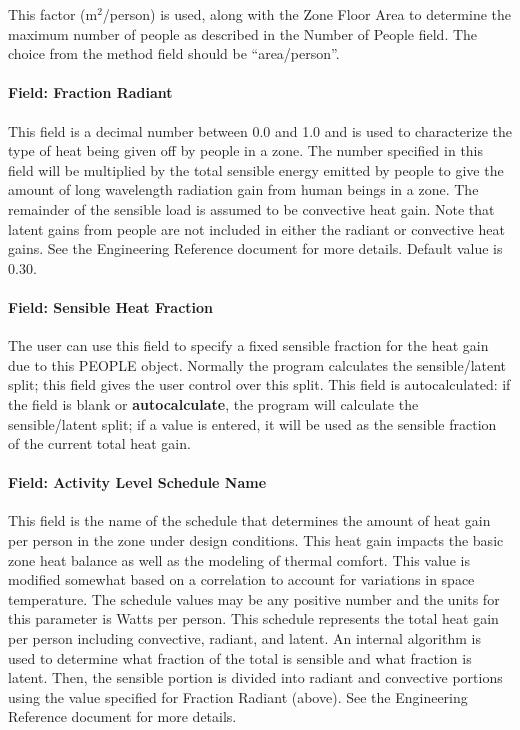 This factor (m\(^{2}\)/person) is used, along with the Zone Floor Area to determine the maximum number of people as described in the Number of People field. The choice from the method field should be ``area/person''.

\paragraph{Field: Fraction Radiant}\label{field-fraction-radiant}

This field is a decimal number between 0.0 and 1.0 and is used to characterize the type of heat being given off by people in a zone. The number specified in this field will be multiplied by the total sensible energy emitted by people to give the amount of long wavelength radiation gain from human beings in a zone. The remainder of the sensible load is assumed to be convective heat gain. Note that latent gains from people are not included in either the radiant or convective heat gains. See the Engineering Reference document for more details. Default value is 0.30.

\paragraph{Field: Sensible Heat Fraction}\label{field-sensible-heat-fraction}

The user can use this field to specify a fixed sensible fraction for the heat gain due to this PEOPLE object. Normally the program calculates the sensible/latent split; this field gives the user control over this split. This field is autocalculated: if the field is blank or \textbf{autocalculate}, the program will calculate the sensible/latent split; if a value is entered, it will be used as the sensible fraction of the current total heat gain.

\paragraph{Field: Activity Level Schedule Name}\label{field-activity-level-schedule-name}

This field is the name of the schedule that determines the amount of heat gain per person in the zone under design conditions. This heat gain impacts the basic zone heat balance as well as the modeling of thermal comfort. This value is modified somewhat based on a correlation to account for variations in space temperature. The schedule values may be any positive number and the units for this parameter is Watts per person. This schedule represents the total heat gain per person including convective, radiant, and latent. An internal algorithm is used to determine what fraction of the total is sensible and what fraction is latent. Then, the sensible portion is divided into radiant and convective portions using the value specified for Fraction Radiant (above). See the Engineering Reference document for more details.

